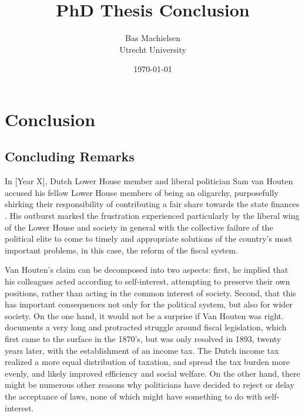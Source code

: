 

\title{\textbf{PhD Thesis Conclusion}}
\author{Bas Machielsen \\ Utrecht University}
\date{\today}



\maketitle

\section{Conclusion}

\subsection{Concluding Remarks}

In [Year X], Dutch Lower House member and liberal politician Sam van Houten accused his fellow Lower House members of being an oligarchy, purposefully shirking their responsibility of contributing a fair share towards the state finances \citep{van2013eerste}. His outburst marked the frustration experienced particularly by the liberal wing of the Lower House and society in general with the collective failure of the political elite to come to timely and appropriate solutions of the country's most important problems, in this case, the reform of the fiscal system. 

Van Houten's claim can be decomposed into two aspects: first, he implied that his colleagues acted according to self-interest, attempting to preserve their own positions, rather than acting in the common interest of society. Second, that this has important consequences not only for the political system, but also for wider society. On the one hand, it would not be a surprise if Van Houten was right. \cite{smit2002omwille} documents a very long and protracted struggle around fiscal legislation, which first came to the surface in the 1870's, but was only resolved in 1893, twenty years later, with the establishment of an income tax. The Dutch income tax realized a more equal distribution of taxation, and spread the tax burden more evenly, and likely improved efficiency and social welfare. On the other hand, there might be numerous other reasons why politicians have decided to reject or delay the acceptance of laws, none of which might have something to do with self-interest. 

